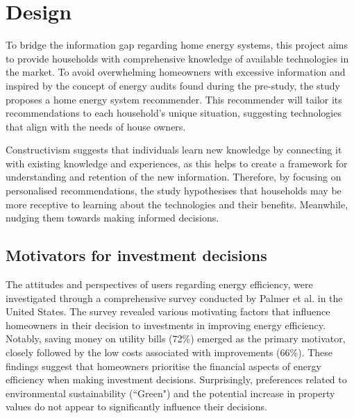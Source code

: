 \chapter{Design} 

To bridge the information gap regarding home energy systems, this project aims to provide households with comprehensive knowledge of available technologies in the market. 
To avoid overwhelming homeowners with excessive information 
and inspired by the concept of energy audits found during the pre-study,
the study proposes a home energy system recommender. 
This recommender will tailor its recommendations to each household's unique situation, 
suggesting technologies that align with the needs of house owners. 

Constructivism suggests that individuals learn new knowledge by connecting it with existing knowledge and experiences, as this helps to create a framework for understanding and retention of the new information.
Therefore, by focusing on personalised recommendations, the study hypothesises that households may be more receptive to learning about the technologies and their benefits. 
Meanwhile, nudging them towards making informed decisions. 


\section{Motivators for investment decisions}

The attitudes and perspectives of users regarding energy efficiency, were investigated through a comprehensive survey conducted by Palmer et al. \cite{informationgap} in the United States.
The survey revealed various motivating factors that influence homeowners in their decision to investments in improving energy efficiency. 
Notably, saving money on utility bills (72\%) emerged as the primary motivator, 
closely followed by the low costs associated with improvements (66\%). 
These findings suggest that homeowners prioritise the financial aspects of energy efficiency when making investment decisions. 
Surprisingly, preferences related to environmental sustainability (``Green") and the potential increase in property values do not appear to significantly influence their decisions.

